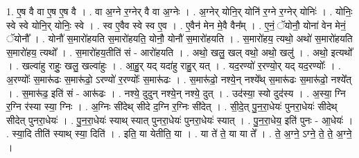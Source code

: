 \documentclass[17pt]{extarticle}
\begin{document}
1. ए॒ष वै वा ए॒ष ए॒ष वै । . वा अ॒ग्ने र॒ग्नेर् वै वा अ॒ग्नेः । . अ॒ग्नेर् योनि॒र् योनि॑ र॒ग्ने र॒ग्नेर् योनिः॑ । . योनिः॒ स्वे स्वे योनि॒र् योनिः॒ स्वे । . स्व ए॒वैव स्वे स्व ए॒व । . ए॒वैन॑ मेन मे॒वै वैन᳚म् । . ए॒नं॒ ॅयोनौ॒ योना॑ वेन मेनं॒ ॅयोनौ᳚ । . योनौ॑ स॒मारो॑हयति स॒मारो॑हयति॒ योनौ॒ योनौ॑ स॒मारो॑हयति । . स॒मारो॑हय॒ त्यथो॒ अथो॑ स॒मारो॑हयति स॒मारो॑हय॒ त्यथो᳚ । . स॒मारो॑हय॒तीति॑ सं - आरो॑हयति । . अथो॒ खलु॒ खल् वथो॒ अथो॒ खलु॑ । . अथो॒ इत्यथो᳚ । . खल्वा॑हु राहुः॒ खलु॒ खल्वा॑हुः । . आ॒हु॒र् यद् यदा॑हु राहु॒र् यत् । . यद॒रण्यो॑ र॒रण्यो॒र् यद् यद॒रण्योः᳚ । . अ॒रण्योः᳚ स॒मारू॑ढः स॒मारू॑ढो॒ ऽरण्यो॑ र॒रण्योः᳚ स॒मारू॑ढः । . स॒मारू॑ढो॒ नश्ये॒न् नश्ये᳚थ् स॒मारू॑ढः स॒मारू॑ढो॒ नश्ये᳚त् । . स॒मारू॑ढ॒ इति॑ सं - आरू॑ढः । . नश्ये॒ दुदुन् नश्ये॒न् नश्ये॒ दुत् । . उद॑स्या॒ स्यो दुद॑स्य । . अ॒स्या॒ ग्नि र॒ग्नि र॑स्या स्या॒ ग्निः । . अ॒ग्निः सी॑देथ् सीदे द॒ग्नि र॒ग्निः सी॑देत् । . सी॒दे॒त् पु॒न॒रा॒धेयः॑ पुनरा॒धेयः॑ सीदेथ् सीदेत् पुनरा॒धेयः॑ । . पु॒न॒रा॒धेयः॑ स्याथ् स्यात् पुनरा॒धेयः॑ पुनरा॒धेयः॑ स्यात् । . पु॒न॒रा॒धेय॒ इति॑ पुनः - आ॒धेयः॑ । . स्या॒दि तीति॑ स्याथ् स्या॒ दिति॑ । . इति॒ या येतीति॒ या । . या ते॑ ते॒ या या ते᳚ । . ते॒ अ॒ग्ने॒ ऽग्ने॒ ते॒ ते॒ अ॒ग्ने॒ । \newline
\end{document}
